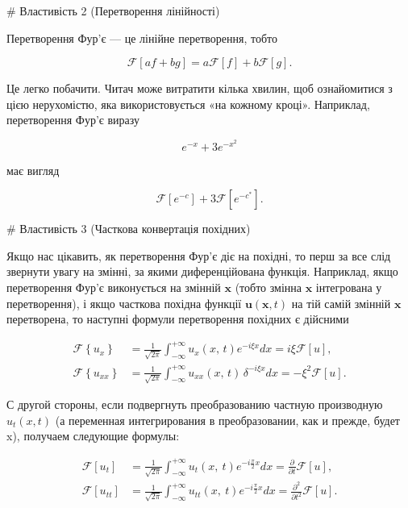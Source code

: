 \documentclass[
  ukrainian,
]{article}
\begin{document}
\# Властивість 2 (Перетворення лінійності)

Перетворення Фур'є --- це лінійне перетворення, тобто

\[
\mathscr{F}[af+bg]=a\mathscr{F}[f]+b\mathscr{F}[g].
\]

Це легко побачити. Читач може витратити кілька хвилин, щоб ознайомитися
з цією нерухомістю, яка використовується «на кожному кроці». Наприклад,
перетворення Фур'є виразу

\[
e^{-x} + 3e^{-x^2}
\]

має вигляд

\[
\mathscr{F}[e^{-c}] + 3\mathscr{F}[e^{-c^*}].
\]

\# Властивість 3 (Часткова конвертація похідних)

Якщо нас цікавить, як перетворення Фур'є діє на похідні, то перш за все
слід звернути увагу на змінні, за якими диференційована функція.
Наприклад, якщо перетворення Фур'є виконується на змінній
\(\boldsymbol{x}\) (тобто змінна \(\boldsymbol{x}\) інтегрована у
перетворення), і якщо часткова похідна функції
\(\boldsymbol{u}(\boldsymbol{x},t)\) на тій самій змінній
\(\boldsymbol{x}\) перетворена, то наступні формули перетворення
похідних є дійсними

\[
\begin{split} \mathcal{F}\left\{u_{x}\right\} &= \frac{1}{\sqrt{2\pi}} \int_{-\infty}^{+\infty} u_{x}\left(x,\,t\right) e^{-i\xi x} dx = i\xi \mathcal{F}\left[u\right], \\ \mathcal{F}\left\{u_{xx}\right\} &= \frac{1}{\sqrt{2\pi}} \int_{-\infty}^{+\infty} u_{xx}\left(x,\,t\right) \, \delta^{-i\xi x} dx = -\xi^{2} \mathcal{F}\left[u\right]. \end{split}
\]

С другой стороны, если подвергнуть преобразованию частную производную
\(u_t(x, t)\) (а переменная интегрирования в преобразовании, как и
прежде, будет x), получаем следующие формулы:

\[
\begin{aligned} \mathcal{F}\left[u_{t}\right] &= \frac{1}{\sqrt{2\pi}} \int_{-\infty}^{+\infty} u_{t}\left(x, \ t\right) e^{-i\frac{\pi}{2}x} dx = \frac{\partial}{\partial t} \mathcal{F}\left[u\right], \\ \mathcal{F}\left[u_{tt}\right] &= \frac{1}{\sqrt{2\pi}} \int_{-\infty}^{+\infty} u_{tt}\left(x, \ t\right) e^{-i\frac{\pi}{2}x} dx = \frac{\partial^{2}}{\partial t^{2}} \mathcal{F}\left[u\right]. \end{aligned}
\]
\end{document}
